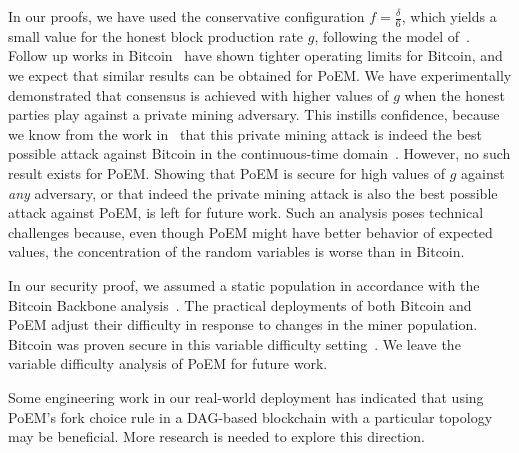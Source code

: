 \noindent
{}
In our proofs, we have used the conservative configuration $f = \frac{\delta}{6}$,
which yields a small value for the honest block production rate $g$, following the model
of~\cite{backbone}. Follow up works in Bitcoin~\cite{tight-bounds} have shown tighter
operating limits for Bitcoin, and we expect that similar results can be obtained for PoEM.
We have experimentally demonstrated that consensus is achieved with higher values
of $g$ when the honest parties play against a private mining adversary. This instills
confidence, because we know from the work in~\cite{eiar} that this private mining attack
is indeed the best possible attack against Bitcoin in the continuous-time domain~\cite{bitcoin-made-simple}.
However, no such result exists for
PoEM. Showing that PoEM is secure for high values of $g$ against \emph{any} adversary,
or that indeed the private mining attack is also the best possible attack against PoEM,
is left for future work. Such an analysis poses technical challenges because, even though
PoEM might have better behavior of expected values, the concentration of the random
variables is worse than in Bitcoin.

\noindent
{}
In our security proof, we assumed a static population in accordance with
the Bitcoin Backbone analysis~\cite{backbone}. The practical deployments of
both Bitcoin and PoEM adjust their difficulty in response to changes in the
miner population. Bitcoin was proven secure in this variable difficulty
setting~\cite{varbackbone}. We leave the variable difficulty analysis of PoEM
for future work.

\noindent
\myparagraph[DAGs]
Some engineering work in our real-world deployment has indicated that using
PoEM's fork choice rule in a DAG-based blockchain with a particular topology
may be beneficial. More research is needed to explore this direction.

